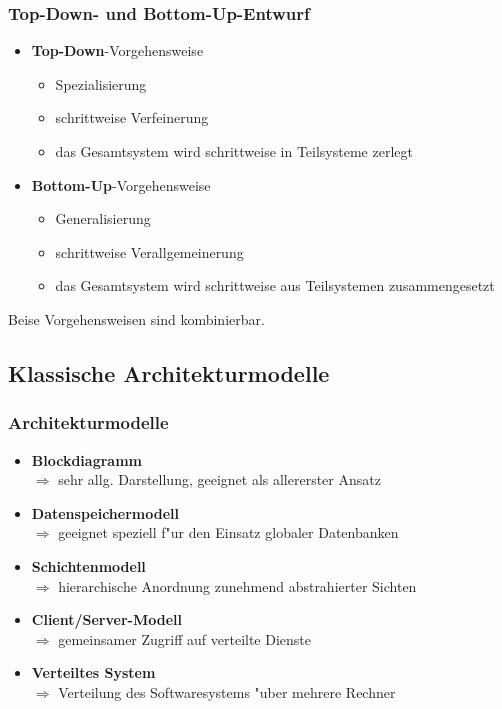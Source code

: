 \subsubsection{Top-Down- und Bottom-Up-Entwurf}
\begin{itemize}
    \item \textbf{Top-Down}-Vorgehensweise
    \begin{itemize}
        \item Spezialisierung
        \item schrittweise Verfeinerung
        \item das Gesamtsystem wird schrittweise in Teilsysteme zerlegt
    \end{itemize}
    \item \textbf{Bottom-Up}-Vorgehensweise
    \begin{itemize}
        \item Generalisierung
        \item schrittweise Verallgemeinerung
        \item das Gesamtsystem wird schrittweise aus Teilsystemen zusammengesetzt
    \end{itemize}
\end{itemize}

Beise Vorgehensweisen sind kombinierbar.


\subsection{Klassische Architekturmodelle}

\subsubsection{Architekturmodelle}
\begin{itemize}
    \item \textbf{Blockdiagramm}\\
    $\Rightarrow$ sehr allg. Darstellung, geeignet als allererster Ansatz
    \item \textbf{Datenspeichermodell}\\
    $\Rightarrow$ geeignet speziell f"ur den Einsatz globaler Datenbanken
    \item \textbf{Schichtenmodell}\\
    $\Rightarrow$ hierarchische Anordnung zunehmend abstrahierter Sichten
    \item \textbf{Client/Server-Modell}\\
    $\Rightarrow$ gemeinsamer Zugriff auf verteilte Dienste
    \item \textbf{Verteiltes System}\\
    $\Rightarrow$ Verteilung des Softwaresystems "uber mehrere Rechner
\end{itemize}

